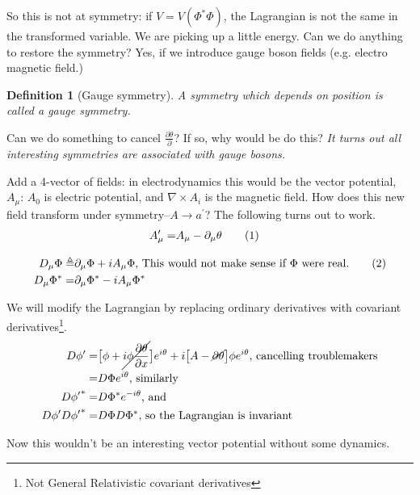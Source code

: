 \documentclass[]{article}
\newcommand\numberthis{\addtocounter{equation}{1}\tag{\theequation}}
\newtheorem{defn}[thm]{Definition}
\begin{document}
So this is not at symmetry: if $V=V(\Phi^*\Phi)$, the Lagrangian is not the same in the transformed variable. We are picking up a little energy. Can we do anything to restore the symmetry? Yes, if we introduce gauge boson fields (e.g. electro magnetic field.)

\begin{defn}[Gauge symmetry]
	A symmetry which depends on position is called a gauge symmetry.
\end{defn}

Can we do something to cancel $\frac{\partial \theta}{\partial}$? If so, why would be do this? \emph{It turns out all interesting symmetries are associated with gauge bosons.}

Add a 4-vector of fields: in electrodynamics this would be the vector potential, $A_\mu$: $A_0$ is electric potential, and $\nabla \times A_i$ is the magnetic field. How does this new field transform under symmetry--$A \rightarrow a^\prime$? The following turns out to work.
\begin{align*}
	A^\prime_\mu =& A_\mu - \partial_\mu \theta \numberthis \label{eq:gauge:field}
\end{align*}



\begin{align*}
	D_\mu \Phi \triangleq& \partial_\mu \Phi + i A_\mu \Phi \text{, This would not make sense if $\Phi$ were real.} \numberthis \label{eq:covariant:derivative}\\
	D_\mu \Phi^* =& \partial_\mu \Phi^* - i A_\mu \Phi^*
\end{align*}

We will modify the Lagrangian by replacing ordinary derivatives with covariant derivatives\footnote{Not General Relativistic covariant derivatives}.
\begin{align*}
	D \phi^\prime =& \big[\phi + \cancel{i \phi \frac{\partial \theta}{\partial x}}\big]e^{i \theta} + i \big[A-\cancel{\partial \theta} \big]\phi e^{i \theta} \text{, cancelling troublemakers}\\
	=& D \Phi  e^{i \theta} \text{, similarly}\\
	D {\phi^\prime}^* =& D {\Phi}^*  e^{-i \theta} \text{, and}\\
	D \phi^\prime D {\phi^\prime}^*=& D \Phi D {\Phi}^* \text{, so the Lagrangian is invariant}
\end{align*}

Now this wouldn't be an interesting vector potential without some dynamics.
\end{document}
